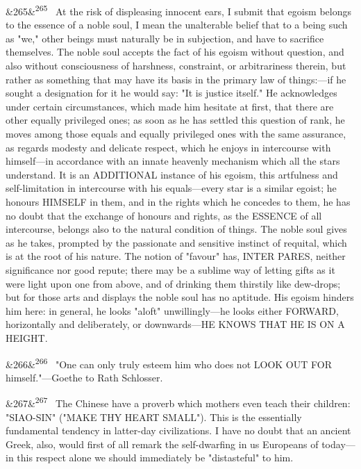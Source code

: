 \documentclass[12pt]{article}
\newcommand{\para}[1][]{\par\noindent\ifx&#1&\else\textsuperscript{\footnotesize #1}~\fi}
\begin{document}
\para[265] At the risk of displeasing innocent ears, I submit that egoism belongs to the essence of a noble soul, I mean the unalterable belief that to a being such as "we," other beings must naturally be in subjection, and have to sacrifice themselves. The noble soul accepts the fact of his egoism without question, and also without consciousness of harshness, constraint, or arbitrariness therein, but rather as something that may have its basis in the primary law of things:---if he sought a designation for it he would say: "It is justice itself." He acknowledges under certain circumstances, which made him hesitate at first, that there are other equally privileged ones; as soon as he has settled this question of rank, he moves among those equals and equally privileged ones with the same assurance, as regards modesty and delicate respect, which he enjoys in intercourse with himself---in accordance with an innate heavenly mechanism which all the stars understand. It is an ADDITIONAL instance of his egoism, this artfulness and self-limitation in intercourse with his equals---every star is a similar egoist; he honours HIMSELF in them, and in the rights which he concedes to them, he has no doubt that the exchange of honours and rights, as the ESSENCE of all intercourse, belongs also to the natural condition of things. The noble soul gives as he takes, prompted by the passionate and sensitive instinct of requital, which is at the root of his nature. The notion of "favour" has, INTER PARES, neither significance nor good repute; there may be a sublime way of letting gifts as it were light upon one from above, and of drinking them thirstily like dew-drops; but for those arts and displays the noble soul has no aptitude. His egoism hinders him here: in general, he looks "aloft" unwillingly---he looks either FORWARD, horizontally and deliberately, or downwards---HE KNOWS THAT HE IS ON A HEIGHT.

\para[266] "One can only truly esteem him who does not LOOK OUT FOR himself."---Goethe to Rath Schlosser.

\para[267] The Chinese have a proverb which mothers even teach their children: "SIAO-SIN" ("MAKE THY HEART SMALL"). This is the essentially fundamental tendency in latter-day civilizations. I have no doubt that an ancient Greek, also, would first of all remark the self-dwarfing in us Europeans of today---in this respect alone we should immediately be "distasteful" to him.
\end{document}
